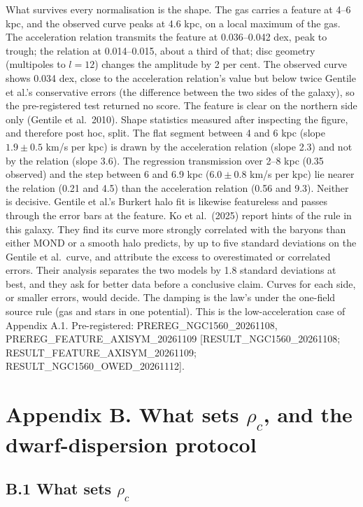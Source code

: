 \documentclass[
  10pt,
]{article}
\begin{document}
What survives every normalisation is the shape. The gas carries a feature at 4--6 kpc, and the observed curve peaks at 4.6 kpc, on a local maximum of the gas. The acceleration relation transmits the feature at 0.036--0.042 dex, peak to trough; the relation at 0.014--0.015, about a third of that; disc geometry (multipoles to $l=12$) changes the amplitude by 2 per cent. The observed curve shows 0.034 dex, close to the acceleration relation's value but below twice Gentile et al.'s conservative errors (the difference between the two sides of the galaxy), so the pre-registered test returned no score. The feature is clear on the northern side only (Gentile et al.~2010). Shape statistics measured after inspecting the figure, and therefore post hoc, split. The flat segment between 4 and 6 kpc (slope $1.9\pm0.5$ km/s per kpc) is drawn by the acceleration relation (slope 2.3) and not by the relation (slope 3.6). The regression transmission over 2--8 kpc (0.35 observed) and the step between 6 and 6.9 kpc ($6.0\pm0.8$ km/s per kpc) lie nearer the relation (0.21 and 4.5) than the acceleration relation (0.56 and 9.3). Neither is decisive. Gentile et al.'s Burkert halo fit is likewise featureless and passes through the error bars at the feature. Ko et al.~(2025) report hints of the rule in this galaxy. They find its curve more strongly correlated with the baryons than either MOND or a smooth halo predicts, by up to five standard deviations on the Gentile et al.\ curve, and attribute the excess to overestimated or correlated errors. Their analysis separates the two models by 1.8 standard deviations at best, and they ask for better data before a conclusive claim. Curves for each side, or smaller errors, would decide. The damping is the law's under the one-field source rule (gas and stars in one potential). This is the low-acceleration case of Appendix A.1. Pre-registered: PREREG\_NGC1560\_20261108, PREREG\_FEATURE\_AXISYM\_20261109 {[}RESULT\_NGC1560\_20261108; RESULT\_FEATURE\_AXISYM\_20261109; RESULT\_NGC1560\_OWED\_20261112{]}.

\section{Appendix B. What sets \texorpdfstring{$\rho_c$}{rho c}, and the dwarf-dispersion protocol}\label{appendix-b.-what-sets-rho_c-and-the-dwarf-dispersion-protocol}

\subsection{B.1 What sets \texorpdfstring{$\rho_c$}{rho c}}\label{what-sets-rho_c}
\end{document}

